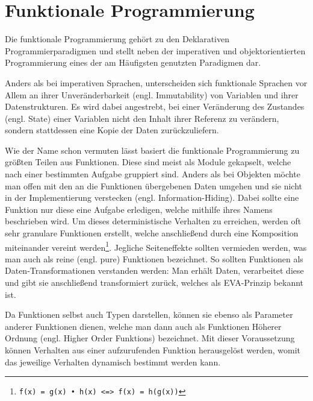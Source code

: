 \section{Funktionale Programmierung}
Die funktionale Programmierung gehört zu den Deklarativen Programmierparadigmen und stellt neben der imperativen und objektorientierten Programmierung eines der am Häufigsten genutzten Paradigmen dar.
\par
Anders als bei imperativen Sprachen, unterscheiden sich funktionale Sprachen vor Allem an ihrer Unveränderbarkeit (engl. Immutability) von Variablen und ihrer Datenstrukturen.
Es wird dabei angestrebt, bei einer Veränderung des Zustandes (engl. State) einer Variablen nicht den Inhalt ihrer Referenz zu verändern, sondern stattdessen eine Kopie der Daten zurückzuliefern.
\par
Wie der Name schon vermuten lässt basiert die funktionale Programmierung zu größten Teilen aus Funktionen. 
Diese sind meist als Module gekapselt, welche nach einer bestimmten Aufgabe gruppiert sind. 
Anders als bei Objekten möchte man offen mit den an die Funktionen übergebenen Daten umgehen und sie nicht in der Implementierung verstecken (engl. Information-Hiding). 
Dabei sollte eine Funktion nur diese eine Aufgabe erledigen, welche mithilfe ihres Namens beschrieben wird. 
Um dieses deterministische Verhalten zu erreichen, werden oft sehr granulare Funktionen erstellt, welche anschließend durch eine Komposition miteinander vereint werden\footnote{\texttt{f(x) = g(x) • h(x) <=> f(x) = h(g(x))}}.
Jegliche Seiteneffekte sollten vermieden werden, was man auch als reine (engl. pure) Funktionen bezeichnet.
So sollten Funktionen als Daten-Transformationen verstanden werden: Man erhält Daten, verarbeitet diese und gibt sie anschließend transformiert zurück, welches als \ac{EVA}-Prinzip bekannt ist.
\par
Da Funktionen selbst auch Typen darstellen, können sie ebenso als Parameter anderer Funktionen dienen, welche man dann auch als Funktionen Höherer Ordnung (engl. Higher Order Funktions) bezeichnet.
Mit dieser Voraussetzung können Verhalten aus einer aufzurufenden Funktion herausgelöst werden, womit das jeweilige Verhalten dynamisch bestimmt werden kann.
